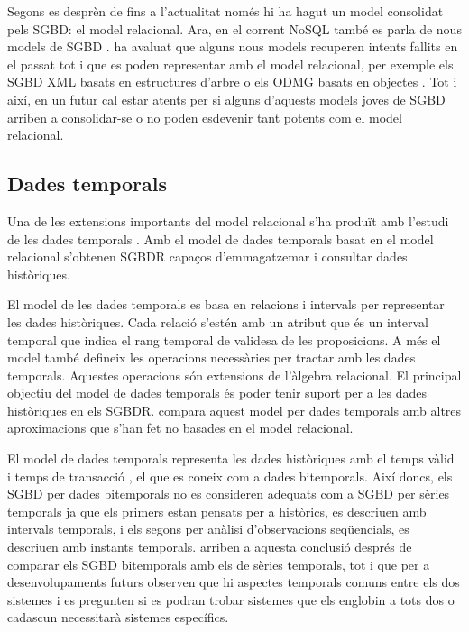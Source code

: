Segons es desprèn de \textcite{date06} fins a l'actualitat només hi ha hagut un model consolidat pels SGBD: el model relacional. 
Ara, en el corrent NoSQL també es parla de nous models de SGBD \parencite{edlich:nosql,stonebraker09:scidb}.
\citeauthor{date06} ha avaluat que alguns nous models recuperen intents fallits en el passat tot i que es poden representar amb el model relacional, per exemple els SGBD XML basats en estructures d'arbre \parencite[cap.~14]{date06} o els ODMG basats en objectes \parencite[cap.~27]{date06}. Tot i així, en un futur cal estar atents per si alguns d'aquests models joves de SGBD arriben a consolidar-se o no poden esdevenir tant potents com el model relacional.





\subsection{Dades temporals}


Una de les extensions importants del model relacional s'ha produït amb
l'estudi de les dades
temporals \parencite{date02:_tempor_data_relat_model}. Amb el model de
dades temporals basat en el model relacional s'obtenen SGBDR capaços
d'emmagatzemar i consultar dades històriques.

El model de les dades
temporals \parencite{date02:_tempor_data_relat_model} es basa en
relacions i intervals per representar les dades històriques. Cada
relació s'estén amb un atribut que és un interval temporal que indica
el rang temporal de validesa de les proposicions. A més el model també
defineix les operacions necessàries per tractar amb les dades
temporals. Aquestes operacions són extensions de l'àlgebra relacional.
El principal objectiu del model de dades temporals és poder tenir
suport per a les dades històriques en els SGBDR.
\textcite[cap.~28]{date06} compara aquest model per dades temporals
amb altres aproximacions que s'han fet no basades en el model
relacional.



El model de dades temporals representa les dades històriques amb el
temps vàlid i temps de
transacció \parencite[cap.~15]{date02:_tempor_data_relat_model}, el
que es coneix com a dades bitemporals.  Així doncs, els SGBD per dades
bitemporals no es consideren adequats com a SGBD per sèries temporals
ja que els primers estan pensats per a històrics, es descriuen amb
intervals temporals, i els segons per anàlisi d'observacions
seqüencials, es descriuen amb instants temporals.
\textcite{schmidt95} arriben a aquesta conclusió després de comparar
els SGBD bitemporals amb els de sèries temporals, tot i que per a
desenvolupaments futurs observen que hi aspectes temporals comuns
entre els dos sistemes i es pregunten si es podran trobar sistemes que
els englobin a tots dos o cadascun necessitarà sistemes específics.


